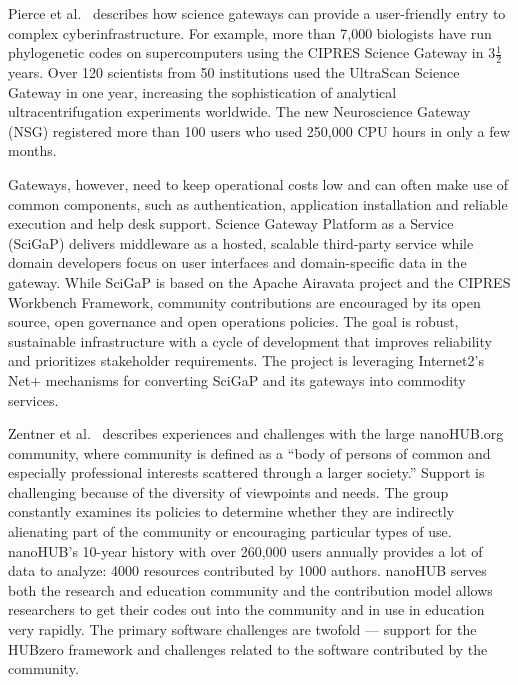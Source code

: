 \documentclass[11pt, oneside]{amsart}
\newcommand{\toolname}[1] {\textsf{#1}}
\begin{document}
Pierce et al.~\cite{Pierce2_WSSSPE} describes how science gateways can
provide a user-friendly entry to complex cyberinfrastructure. For
example, more than 7,000 biologists have run phylogenetic codes on
supercomputers using the CIPRES Science Gateway in $3 \tfrac{1}{2}$
years. Over 120 scientists from 50 institutions used the
\toolname{UltraScan Science Gateway} in one year, increasing the
sophistication of analytical ultracentrifugation experiments
worldwide. The new Neuroscience Gateway (\toolname{NSG}) registered
more than 100 users who used 250,000 CPU hours in only a few months.

Gateways, however, need to keep operational costs low and can often
make use of common components, such as authentication, application
installation and reliable execution and help desk support. Science
Gateway Platform as a Service (\toolname{SciGaP}) delivers middleware
as a hosted, scalable third-party service while domain developers
focus on user interfaces and domain-specific data in the gateway.
While \toolname{SciGaP} is based on the \toolname{Apache Airavata}
project and the \toolname{CIPRES} Workbench Framework, community
contributions are encouraged by its open source, open governance and
open operations policies. The goal is robust, sustainable
infrastructure with a cycle of development that improves reliability
and prioritizes stakeholder requirements. The project is leveraging
Internet2's \toolname{Net+} mechanisms for converting
\toolname{SciGaP} and its gateways into commodity services.

Zentner et al.~\cite{Zentner_WSSSPE} describes experiences and
challenges with the large \toolname{nanoHUB.org} community, where
community is defined as a ``body of persons of common and especially
professional interests scattered through a larger society.'' Support
is challenging because of the diversity of viewpoints and needs. The
group constantly examines its policies to determine whether they are
indirectly alienating part of the community or encouraging particular
types of use.
%
\toolname{nanoHUB}'s 10-year history with over 260,000 users annually
provides a lot of data to analyze: 4000 resources contributed by 1000
authors. \toolname{nanoHUB} serves both the research and education
community and the contribution model allows researchers to get their
codes out into the community and in use in education very rapidly. The
primary software challenges are twofold --- support for the
\toolname{HUBzero} framework and challenges related to the software
contributed by the community.
\end{document}
